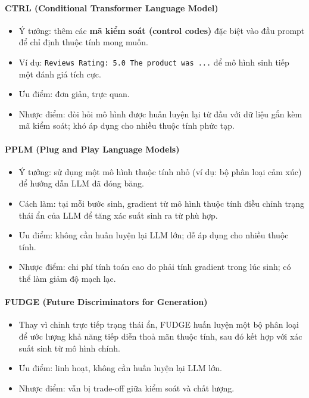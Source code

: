 \paragraph{CTRL (Conditional Transformer Language Model)}
\begin{itemize}
    \item Ý tưởng: thêm các \textbf{mã kiểm soát (control codes)} đặc biệt vào đầu prompt để chỉ định thuộc tính mong muốn. 
    \item Ví dụ: \texttt{Reviews Rating: 5.0 The product was ...} để mô hình sinh tiếp một đánh giá tích cực.
    \item Ưu điểm: đơn giản, trực quan.
    \item Nhược điểm: đòi hỏi mô hình được huấn luyện lại từ đầu với dữ liệu gắn kèm mã kiểm soát; khó áp dụng cho nhiều thuộc tính phức tạp.
\end{itemize}

\paragraph{PPLM (Plug and Play Language Models)}
\begin{itemize}
    \item Ý tưởng: sử dụng một mô hình thuộc tính nhỏ (ví dụ: bộ phân loại cảm xúc) để hướng dẫn LLM đã đóng băng.
    \item Cách làm: tại mỗi bước sinh, gradient từ mô hình thuộc tính điều chỉnh trạng thái ẩn của LLM để tăng xác suất sinh ra từ phù hợp.
    \item Ưu điểm: không cần huấn luyện lại LLM lớn; dễ áp dụng cho nhiều thuộc tính.
    \item Nhược điểm: chi phí tính toán cao do phải tính gradient trong lúc sinh; có thể làm giảm độ mạch lạc.
\end{itemize}

\paragraph{FUDGE (Future Discriminators for Generation)}
\begin{itemize}
    \item Thay vì chỉnh trực tiếp trạng thái ẩn, FUDGE huấn luyện một bộ phân loại để ước lượng khả năng tiếp diễn thoả mãn thuộc tính, sau đó kết hợp với xác suất sinh từ mô hình chính.
    \item Ưu điểm: linh hoạt, không cần huấn luyện lại LLM lớn.
    \item Nhược điểm: vẫn bị trade-off giữa kiểm soát và chất lượng.
\end{itemize}

